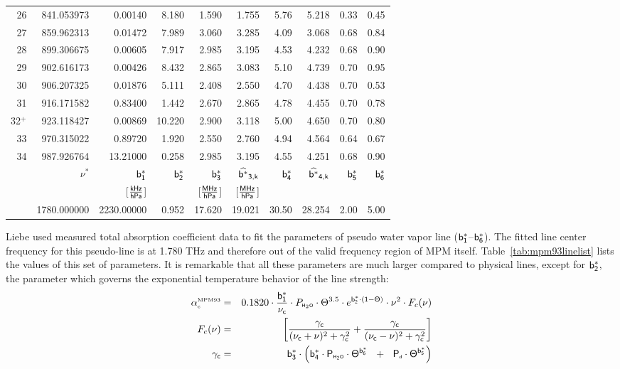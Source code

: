\begin{longtable}{rrrrrrrrrr}
26     & 841.053973 & 0.00140 & 8.180 & 1.590 & 1.755 & 5.76 & 5.218 & 0.33 & 0.45 \\
27     & 859.962313 & 0.01472 & 7.989 & 3.060 & 3.285 & 4.09 & 3.068 & 0.68 & 0.84 \\
28     & 899.306675 & 0.00605 & 7.917 & 2.985 & 3.195 & 4.53 & 4.232 & 0.68 & 0.90 \\
29     & 902.616173 & 0.00426 & 8.432 & 2.865 & 3.083 & 5.10 & 4.739 & 0.70 & 0.95 \\
30     & 906.207325 & 0.01876 & 5.111 & 2.408 & 2.550 & 4.70 & 4.438 & 0.70 & 0.53 \\
31     & 916.171582 & 0.83400 & 1.442 & 2.670 & 2.865 & 4.78 & 4.455 & 0.70 & 0.78 \\
32$^+$ & 923.118427 & 0.00869 & 10.220& 2.900 & 3.118 & 5.00 & 4.650 & 0.70 & 0.80 \\
33     & 970.315022 & 0.89720 & 1.920 & 2.550 & 2.760 & 4.94 & 4.564 & 0.64 & 0.67 \\
34     & 987.926764 & 13.21000& 0.258 & 2.985 & 3.195 & 4.55 & 4.251 & 0.68 & 0.90 \\
\hline
 & $\nu^*$ & $\sf b^*_{\sf 1}$ & $\sf b^*_{\sf 2}$ & $\sf b^*_{\sf 3}$ & $\sf \widehat{b^*}_{\sf 3,k}$ & $\sf b^*_{\sf 4}$ &
 $\sf \widehat{b^*}_{\sf 4,k}$ & $\sf b^*_{\sf 5}$ & $\sf b^*_{\sf 6}$\\
 & {\sf [GHz]}  & {[$\frac{\sf kHz}{\sf hPa}$]} & {\sf [1]} & 
 {[$\frac{\sf MHz}{\sf hPa}$]} & {[$\frac{\sf MHz}{\sf hPa}$]} & 
 {\sf [1]} & {\sf [1]} & {\sf [1]} & {\sf [1]} \\
\hline
 & 1780.000000 & 2230.00000 & 0.952 & 17.620 & 19.021 & 30.50 & 28.254 & 2.00 & 5.00 \\
\end{longtable}
%
%
\label{levele:mpm93:contabs}
Liebe used measured total absorption coefficient data to fit the 
parameters of pseudo water vapor line ($\sf b^*_{\sf 1}$--$\sf b^*_{\sf 6}$). 
The fitted line center frequency for this pseudo-line is at 
1.780 THz and therefore out of the valid frequency region of MPM 
itself. Table~\ref{tab:mpm93linelist} lists the values of this set 
of parameters. It is remarkable that all these parameters are much 
larger compared to physical lines, except for $\sf b^*_{\sf 2}$, the parameter 
which governs the exponential temperature behavior of the line strength:
\begin{eqnarray}
  \label{eq:mpm93:contabs}
  \alphampmnc & = & 0.1820 \cdot \frac{\beks}{\nucc} \cdot \phzo \cdot 
                \Theta^{3.5} \cdot e^{\bzks\cdot(1-\Theta)} \cdot 
                \nu^2 \cdot F_c(\nu)\\
%
  \label{eq:mpm93:contabs1}
  F_c(\nu) & = & \left[\frac{\gamc}{(\nucc+\nu)^2+\gamc^2} + 
                       \frac{\gamc}{(\nucc-\nu)^2+\gamc^2}\right]\\
%
  \label{eq:mpm93:contabs2}
  \gamc & = &  \bdks \cdot 
          \left(\bvks \cdot \phzo \cdot \Theta^{\bsks}~~+~~ 
                            \pda  \cdot \Theta^{\bfks}\right)\\
\nonumber
\end{eqnarray}
